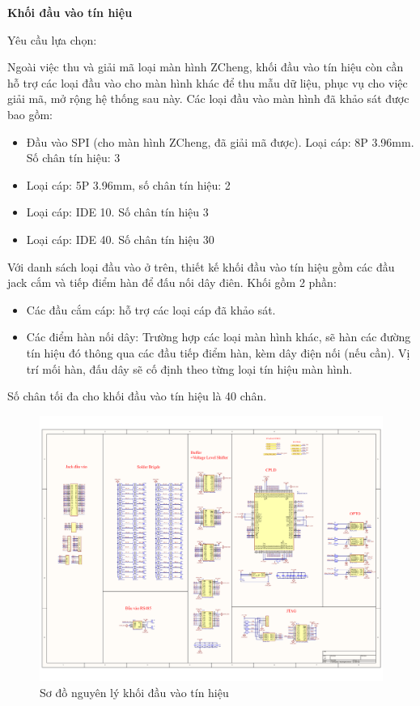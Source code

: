 \textbf{Khối đầu vào tín hiệu}


 Yêu cầu lựa chọn: 

Ngoài việc thu và giải mã loại màn hình ZCheng, khối đầu vào tín hiệu còn cần hỗ trợ các loại đầu vào cho màn hình khác để thu mẫu dữ liệu, phục vụ cho việc giải mã, mở rộng hệ thống sau này. Các loại đầu vào màn hình đã khảo sát được bao gồm:

\begin{itemize}
    \item Đầu vào SPI (cho màn hình ZCheng, đã giải mã được). Loại cáp: 8P 3.96mm. Số chân tín hiệu: 3
    \item Loại cáp: 5P 3.96mm, số chân tín hiệu: 2
    \item Loại cáp: IDE 10. Số chân tín hiệu 3
    \item Loại cáp: IDE 40. Số chân tín hiệu 30
\end{itemize}

Với danh sách loại đầu vào ở trên, thiết kế khối đầu vào tín hiệu gồm các đầu jack cắm và tiếp điểm hàn để đấu nối dây điên. Khối gồm 2 phần: 

\begin{itemize}
    \item Các đầu cắm cáp: hỗ trợ các loại cáp đã khảo sát.
    \item Các điểm hàn nối dây: Trường hợp các loại màn hình khác, sẽ hàn các đường tín hiệu đó thông qua các đầu tiếp điểm hàn, kèm dây điện nối (nếu cần). Vị trí mối hàn, đấu dây sẽ cố định theo từng loại tín hiệu màn hình.
\end{itemize}

Số chân tối đa cho khối đầu vào tín hiệu là 40 chân.

\begin{figure}[!ht]
    \centering
    \includegraphics[width=1.0\linewidth]{Figures/Chap3_Input-signal-block-principle.pdf}
    \caption{Sơ đồ nguyên lý khối đầu vào tín hiệu}
    \label{fig:hinh3.6}
\end{figure}






















